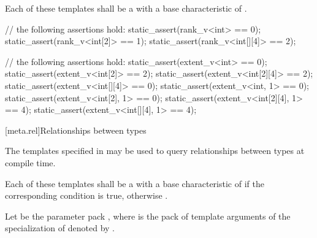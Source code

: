 \pnum
Each of these templates shall be a  with a
base characteristic of .

\pnum
\begin{example}
\begin{codeblock}
// the following assertions hold:
static_assert(rank_v<int> == 0);
static_assert(rank_v<int[2]> == 1);
static_assert(rank_v<int[][4]> == 2);
\end{codeblock}
\end{example}

\pnum
\begin{example}
\begin{codeblock}
// the following assertions hold:
static_assert(extent_v<int> == 0);
static_assert(extent_v<int[2]> == 2);
static_assert(extent_v<int[2][4]> == 2);
static_assert(extent_v<int[][4]> == 0);
static_assert(extent_v<int, 1> == 0);
static_assert(extent_v<int[2], 1> == 0);
static_assert(extent_v<int[2][4], 1> == 4);
static_assert(extent_v<int[][4], 1> == 4);
\end{codeblock}
\end{example}

[meta.rel]{Relationships between types}

\pnum
The templates specified in 
may be used to query relationships between types at compile time.

\pnum
Each of these templates shall be a
with a base characteristic of
 if the corresponding condition is true, otherwise
.

\pnum
Let  be the parameter pack
, where  is the pack of
 template arguments of the specialization of
 denoted by
.

